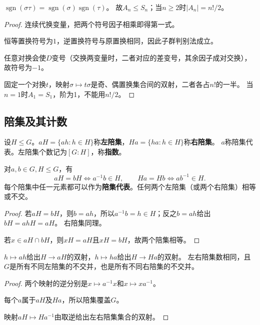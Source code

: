 \begin{proposition}
$\operatorname{sgn}(\sigma\tau)=\operatorname{sgn}(\sigma)\operatorname{sgn}(\tau)$。
故$A_n\leq S_n$；当$n\geq2$时$|A_n|=n!/2$。
\end{proposition}
\begin{proof}
连续代换变量，把两个符号因子相乘即得第一式。

恒等置换符号为$1$，逆置换符号与原置换相同，因此子群判别法成立。

任意对换会使$D$变号（交换两变量时，二者对应的差变号，其余因子成对交换），故符号为$-1$。

固定一个对换$t$，映射$\sigma\mapsto t\sigma$是奇、偶置换集合间的双射，二者各占$n!$的一半。
当$n=1$时$A_1=S_1$，阶为1，不能用$n!/2$。

\end{proof}

\subsection*{陪集及其计数}
\begin{definition}
\label{p2:concept:c1-l311}设$H\leq G$。$aH=\{ah:h\in H\}$称\textbf{左陪集}，$Ha=\{ha:h\in H\}$称\textbf{右陪集}。
\label{p2:concept:c1-l312}$a$称陪集代表。左陪集个数记为$[G:H]$，称\textbf{指数}。
\end{definition}

\begin{proposition}
对$a,b\in G,H\leqslant G$，有
\[
aH=bH\iff a^{-1}b\in H,
\qquad Ha=Hb\iff ab^{-1}\in H.
\]
每个陪集中任一元素都可以作为\textbf{陪集代表}。任何两个左陪集（或两个右陪集）相等或不交。
\end{proposition}
\begin{proof}
若$aH=bH$，则$b=ah$，所以$a^{-1}b=h\in H$；反之$b=ah$给出$bH=ahH=aH$。
右陪集同理。

若$x\in aH\cap bH$，则$xH=aH$且$xH=bH$，故两个陪集相等。
\end{proof}

\begin{proposition}
$h\mapsto ah$给出$H\to aH$的双射，$h\mapsto ha$给出$H\to Ha$的双射。
左右陪集数相同，且$G$是所有不同左陪集的不交并，也是所有不同右陪集的不交并。
\end{proposition}
\begin{proof}
两个映射的逆分别是$x\mapsto a^{-1}x$和$x\mapsto xa^{-1}$。

每个$a$属于$aH$及$Ha$，所以陪集覆盖$G$。

映射$aH\mapsto Ha^{-1}$由取逆给出左右陪集集合的双射。
\end{proof}

